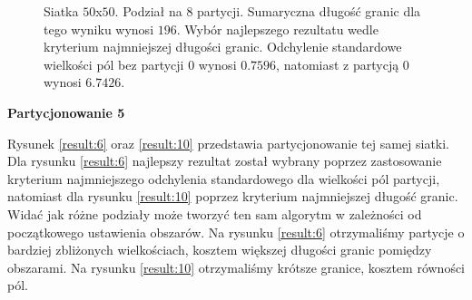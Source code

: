 \begin{figure}[h]
\begin{subfigure}{.33\textwidth}
    \caption[short]{}
\end{subfigure}
\caption{Siatka $50$x$50$. Podział na $8$ partycji. Sumaryczna długość granic dla tego wyniku wynosi $196$.
Wybór najlepszego rezultatu wedle kryterium najmniejszej długości granic.
Odchylenie standardowe wielkości pól bez partycji $0$ wynosi $0.7596$, natomiast z partycją $0$ wynosi $6.7426$.}
\label{result:5}
\end{figure}

\newpage
\vspace{3mm}
\textbf{Partycjonowanie 5}
\vspace{1mm}

Rysunek \ref{result:6} oraz \ref{result:10} przedstawia partycjonowanie tej samej siatki.
Dla rysunku \ref{result:6} najlepszy rezultat został wybrany poprzez zastosowanie kryterium najmniejszego odchylenia standardowego
dla wielkości pól partycji, natomiast dla rysunku \ref{result:10} poprzez kryterium najmniejszej długość granic.
Widać jak różne podziały może tworzyć ten sam algorytm w zależności od początkowego ustawienia obszarów.
Na rysunku \ref{result:6} otrzymaliśmy partycje o bardziej zbliżonych wielkościach, kosztem większej długości granic pomiędzy obszarami.
Na rysunku \ref{result:10} otrzymaliśmy krótsze granice, kosztem równości pól.
